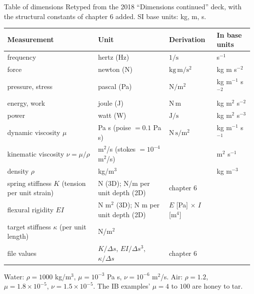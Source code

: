 \documentclass[aspectratio=169,11pt]{beamer}
\begin{document}
\begin{frame}{Table of dimensions}
\label{fr:dims}
\footnotesize Retyped from the 2018 ``Dimensions continued'' deck, with the structural constants of chapter 6 added. SI base units: kg, m, s.

\tiny
\begin{tabular}{@{}L{0.26\textwidth}L{0.14\textwidth}L{0.22\textwidth}L{0.24\textwidth}@{}}
\toprule
Measurement & Unit & Derivation & In base units\\
\midrule
frequency & hertz (Hz) & $1/\mathrm{s}$ & s$^{-1}$\\
force & newton (N) & $\mathrm{kg\,m/s^2}$ & kg m s$^{-2}$\\
pressure, stress & pascal (Pa) & $\mathrm{N/m^2}$ & kg m$^{-1}$ s$^{-2}$\\
energy, work & joule (J) & $\mathrm{N\,m}$ & kg m$^2$ s$^{-2}$\\
power & watt (W) & $\mathrm{J/s}$ & kg m$^2$ s$^{-3}$\\
dynamic viscosity $\mu$ & Pa s (poise $= 0.1$ Pa s) & $\mathrm{N\,s/m^2}$ & kg m$^{-1}$ s$^{-1}$\\
kinematic viscosity $\nu = \mu/\rho$ & m$^2$/s (stokes $= 10^{-4}$ m$^2$/s) & & m$^2$ s$^{-1}$\\
density $\rho$ & kg/m$^3$ & & kg m$^{-3}$\\
\midrule
spring stiffness $K$ (tension per unit strain) & N (3D); N/m per unit depth (2D) & chapter 6 & \\
flexural rigidity $EI$ & N m$^2$ (3D); N m per unit depth (2D) & $E$ [Pa] $\times$ $I$ [m$^4$] & \\
target stiffness $\kappa$ (per unit length) & N/m$^2$ & & \\
file values & $K/\Delta s$, $EI/\Delta s^3$, $\kappa/\Delta s$ & chapter 6 & \\
\bottomrule
\end{tabular}

\footnotesize Water: $\rho = 1000$ kg/m$^3$, $\mu = 10^{-3}$ Pa s, $\nu = 10^{-6}$ m$^2$/s. Air: $\rho = 1.2$, $\mu = 1.8\times10^{-5}$, $\nu = 1.5\times10^{-5}$. The IB examples' $\mu = 4$ to $100$ are honey to tar.
\end{frame}
\end{document}
